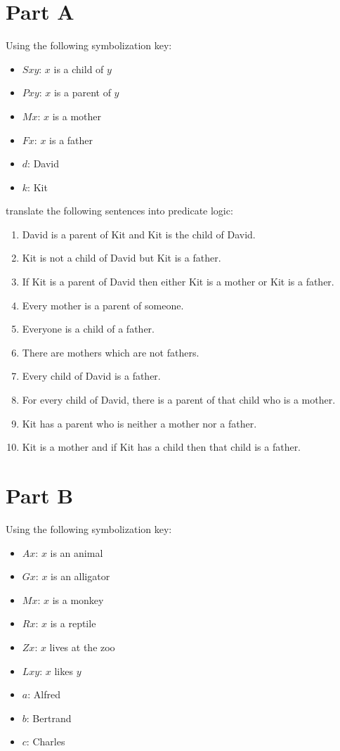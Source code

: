 \documentclass[
]{book}
\providecommand{\tightlist}{%
  \setlength{\itemsep}{0pt}\setlength{\parskip}{0pt}}
\begin{document}
\hypertarget{part-a}{%
\section{Part A}\label{part-a}}

Using the following symbolization key:

\begin{itemize}
\tightlist
\item
  \(Sxy\): \(x\) is a child of \(y\)
\item
  \(Pxy\): \(x\) is a parent of \(y\)
\item
  \(Mx\): \(x\) is a mother
\item
  \(Fx\): \(x\) is a father
\item
  \(d\): David
\item
  \(k\): Kit
\end{itemize}

translate the following sentences into predicate logic:

\begin{enumerate}
\def\labelenumi{\arabic{enumi}.}
\tightlist
\item
  David is a parent of Kit and Kit is the child of David.
\item
  Kit is not a child of David but Kit is a father.
\item
  If Kit is a parent of David then either Kit is a mother or Kit is a father.
\item
  Every mother is a parent of someone.
\item
  Everyone is a child of a father.
\item
  There are mothers which are not fathers.
\item
  Every child of David is a father.
\item
  For every child of David, there is a parent of that child who is a mother.
\item
  Kit has a parent who is neither a mother nor a father.
\item
  Kit is a mother and if Kit has a child then that child is a father.
\end{enumerate}

\hypertarget{part-b}{%
\section{Part B}\label{part-b}}

Using the following symbolization key:

\begin{itemize}
\tightlist
\item
  \(Ax\): \(x\) is an animal
\item
  \(Gx\): \(x\) is an alligator
\item
  \(Mx\): \(x\) is a monkey
\item
  \(Rx\): \(x\) is a reptile
\item
  \(Zx\): \(x\) lives at the zoo
\item
  \(Lxy\): \(x\) likes \(y\)
\item
  \(a\): Alfred
\item
  \(b\): Bertrand
\item
  \(c\): Charles
\end{itemize}
\end{document}
